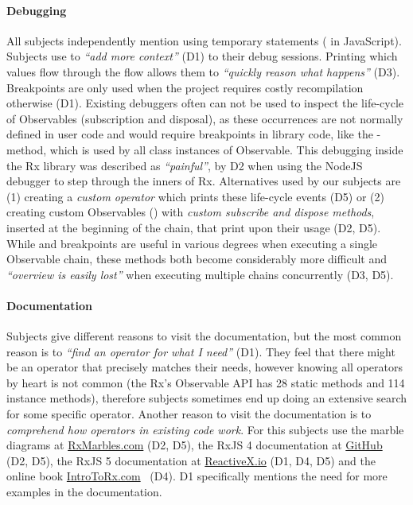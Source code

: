 \paragraph{Debugging}
All subjects independently mention using temporary \printfdebugging{} statements ( in JavaScript).
Subjects use \printfdebugging{} to \emph{``add more context''} (D1) to their debug sessions. 
Printing which values flow through the flow allows them to \emph{``quickly reason what happens''} (D3). 
Breakpoints are only used when the project requires costly recompilation otherwise (D1).
Existing debuggers often can not be used to inspect the life-cycle of Observables (subscription and disposal),
as these occurrences are not normally defined in user code and would require breakpoints in library code, 
like the -method, which is used by all class instances of Observable. 
This debugging inside the Rx library was described as \emph{``painful''}, by D2 when using the NodeJS debugger to step through the inners of Rx.
Alternatives used by our subjects are (1) creating a \emph{custom  operator} which prints these life-cycle events (D5) or (2) creating custom Observables () with \emph{custom subscribe and dispose methods}, inserted at the beginning of the chain, that print upon their usage (D2, D5).
While \printfdebugging{} and breakpoints are useful in various degrees when executing a single Observable chain,
these methods both become considerably more difficult and \emph{``overview is easily lost''} when executing multiple chains concurrently (D3, D5).

\paragraph{Documentation}
Subjects give different reasons to visit the documentation, but the most common reason is to \emph{``find an operator for what I need''} (D1). They feel that there might be an operator that precisely matches their needs, however knowing all operators by heart is not common (the Rx's Observable API has 28 static methods and 114 instance methods), therefore subjects sometimes end up doing an extensive search for some specific operator. Another reason to visit the documentation is to \emph{comprehend how operators in existing code work}. For this subjects use the marble diagrams at \href{http://rxmarbles.com}{RxMarbles.com} (D2, D5), the RxJS 4 documentation at \href{https://github.com/Reactive-Extensions/RxJS/blob/master/doc/}{GitHub} (D2, D5), the RxJS 5 documentation at \href{http://reactivex.io/rxjs}{ReactiveX.io} (D1, D4, D5) and the online book \href{http://introtorx.com}{IntroToRx.com}~\cite{introtorx} (D4). D1 specifically mentions the need for more examples in the documentation.

